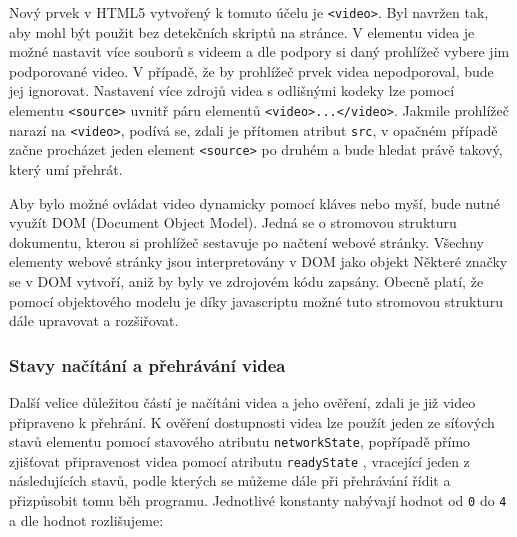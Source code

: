 Nový prvek v HTML5 vytvořený k tomuto účelu je \texttt{<video>}. Byl navržen tak, aby mohl být použit bez detekčních skriptů na stránce. V elementu videa je možné nastavit více souborů s videem a dle podpory si daný prohlížeč vybere jim podporované video. V případě, že by prohlížeč prvek videa nepodporoval, bude jej ignorovat. Nastavení více zdrojů videa s odlišnými kodeky lze pomocí elementu \texttt{<source>} uvnitř páru elementů \texttt{<video>...</video>}. Jakmile prohlížeč narazí na \texttt{<video>}, podívá se, zdali je přítomen atribut \texttt{src}, v opačném případě začne procházet jeden element \texttt{<source>} po druhém a bude hledat právě takový, který umí přehrát.

Aby bylo možné ovládat video dynamicky pomocí kláves nebo myší, bude nutné využít DOM (Document Object Model). Jedná se o stromovou strukturu dokumentu, kterou si prohlížeč sestavuje po načtení webové stránky. Všechny elementy webové stránky jsou interpretovány v DOM jako objekt Některé značky se v DOM vytvoří, aniž by byly ve zdrojovém kódu zapsány. Obecně platí, že pomocí objektového modelu je díky javascriptu možné tuto stromovou strukturu dále upravovat a rozšiřovat. 



\subsubsection{Stavy načítání a přehrávání videa}
Další velice důležitou částí je načítáni videa a jeho ověření, zdali  je již video připraveno k přehrání. K ověření dostupnosti videa lze použít jeden ze síťových stavů elementu pomocí stavového atributu \texttt{networkState}, popřípadě přímo zjišťovat připravenost videa pomocí atributu \texttt{readyState} \cite{html5}, vracející jeden z následujících stavů, podle kterých se můžeme dále při přehrávání řídit a přizpůsobit tomu běh programu. Jednotlivé konstanty nabývají hodnot od \texttt{0} do \texttt{4} a dle hodnot rozlišujeme:


